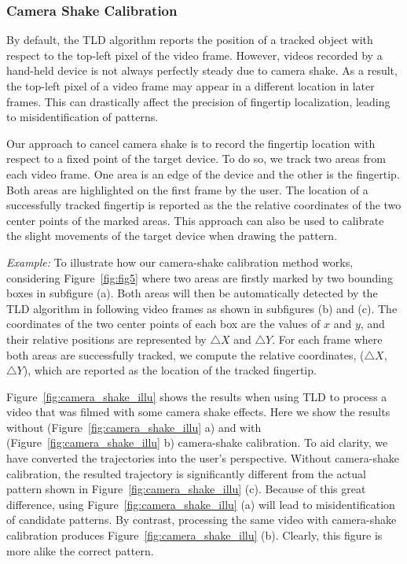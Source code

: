         \subsubsection{Camera Shake Calibration}
        \label{secction:shake}
         By default, the TLD algorithm reports the position of a tracked object with respect to the top-left pixel of the video frame.
         However, videos recorded by a hand-held device is not always perfectly steady due to
        camera shake. As a result, the top-left pixel of a video frame may appear in a different location in later frames.
        This can drastically affect the precision of fingertip localization, leading to misidentification of patterns.

        Our approach to cancel camera shake is to record the fingertip
        location with respect to a fixed point of the target device. To do so, we track two
        areas from each video frame. One area is an edge of the device and
        the other is the fingertip. Both areas are highlighted on the
        first frame by the user.
        The location of a successfully tracked fingertip is reported as the
        the relative coordinates of the two center points of the marked areas.
        This approach can also be used to calibrate the slight movements of the target device when drawing the pattern.

        \noindent \emph{Example:} To illustrate how our camera-shake calibration method  works, considering
        Figure~\ref{fig:fig5} where two areas are firstly marked by two
        bounding boxes in subfigure (a).
        Both areas will
        then be automatically detected by the TLD algorithm in following video
        frames as shown in subfigures (b) and (c).
        The coordinates of the two center points of each box are the values of $x$ and $y$, and their relative positions are represented by
        $\triangle X$ and $\triangle Y$.
        For each frame
        where both areas are successfully tracked, we
        compute the relative coordinates, ($\triangle X$, $\triangle Y$), which are reported as the location of the tracked fingertip.

        Figure~\ref{fig:camera_shake_illu} shows the results when using TLD to process a video that was filmed with some camera shake effects.
        Here we show the results without (Figure~\ref{fig:camera_shake_illu} a) and with (Figure~\ref{fig:camera_shake_illu} b) camera-shake calibration. To aid clarity, we have
        converted the trajectories into the user's perspective. Without
        camera-shake calibration, the resulted trajectory is significantly different from the actual pattern shown in Figure~\ref{fig:camera_shake_illu} (c).
        Because of this great difference, using Figure~\ref{fig:camera_shake_illu} (a)  will lead to misidentification of
        candidate patterns. By contrast, processing the same video
         with camera-shake calibration  produces Figure~\ref{fig:camera_shake_illu} (b). Clearly, this figure is more
        alike the correct pattern.

